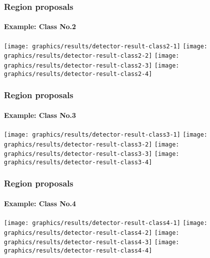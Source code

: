 \begin{frame}
\frametitle{Region proposals}
\framesubtitle{Example: Class No.2}
	 {
		\texttt{[image: graphics/results/detector-result-class2-1]}
	}
	\only<2-4> {
		\texttt{[image: graphics/results/detector-result-class2-2]}
	}
	\only<3-4> {
		\texttt{[image: graphics/results/detector-result-class2-3]}
	}
	\only<4> {
		\texttt{[image: graphics/results/detector-result-class2-4]}
	}
\end{frame}

\begin{frame}
\frametitle{Region proposals}
\framesubtitle{Example: Class No.3}
	 {
		\texttt{[image: graphics/results/detector-result-class3-1]}
	}
	\only<2-4> {
		\texttt{[image: graphics/results/detector-result-class3-2]}
	}
	\only<3-4> {
		\texttt{[image: graphics/results/detector-result-class3-3]}
	}
	\only<4> {
		\texttt{[image: graphics/results/detector-result-class3-4]}
	}
\end{frame}

\begin{frame}
\frametitle{Region proposals}
\framesubtitle{Example: Class No.4}
	 {
		\texttt{[image: graphics/results/detector-result-class4-1]}
	}
	\only<2-4> {
		\texttt{[image: graphics/results/detector-result-class4-2]}
	}
	\only<3-4> {
		\texttt{[image: graphics/results/detector-result-class4-3]}
	}
	\only<4> {
		\texttt{[image: graphics/results/detector-result-class4-4]}
	}
\end{frame}

